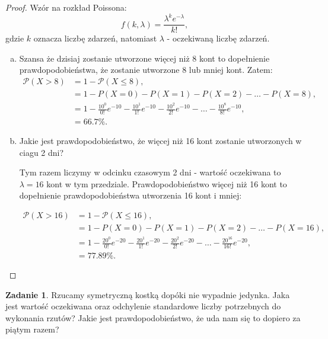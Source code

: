 \documentclass[11pt]{article}
\theoremstyle{definition}
\newtheorem{zadanie}{Zadanie}
\numberwithin{zadanie}{section}
\begin{document}
\begin{proof}Wzór na rozkład Poissona:
    $$f(k,\lambda) = \frac{\lambda^ke^{-\lambda}}{k!},$$
    gdzie $k$ oznacza liczbę zdarzeń, natomiast $\lambda$ - oczekiwaną liczbę zdarzeń.
    \begin{enumerate}[a)]
        \item Szansa że dzisiaj zostanie utworzone więcej niż 8 kont to dopełnienie prawdopodobieństwa, że zostanie utworzone 8 lub mniej kont. Zatem:
              \begin{align*}
                  \mathcal P(X>8) & = 1-\mathcal P(X\leq 8),                                                                                \\
                                  & = 1-P(X=0)-P(X=1)-P(X=2)-\dots-P(X=8),                                                                  \\
                                  & = 1- \frac{10^0}{0!}e^{-10}-\frac{10^1}{1!}e^{-10}-\frac{10^2}{2!}e^{-10}-\dots-\frac{10^8}{8!}e^{-10}, \\
                                  & = 66.7\%.
              \end{align*}
        \item Jakie jest prawdopodobieństwo, że więcej niż 16 kont zostanie utworzonych w ciagu 2 dni?

              Tym razem liczymy w odcinku czasowym 2 dni - wartość oczekiwana to $\lambda=16$ kont w tym przedziale.
              Prawdopodobieństwo więcej niż 16 kont to dopełnienie prawdopodobieństwa utworzenia 16 kont i mniej:

              \begin{align*}
                  \mathcal P(X>16) & = 1-\mathcal P(X\leq 16),                                                                                 \\
                                   & = 1-P(X=0)-P(X=1)-P(X=2)-\dots-P(X=16),                                                                   \\
                                   & = 1- \frac{20^0}{0!}e^{-20}-\frac{20^1}{1!}e^{-20}-\frac{20^2}{2!}e^{-20}-\dots-\frac{20^{16}}{16!}e^{-20}, \\
                                   & = 77.89\%.
              \end{align*}
    \end{enumerate}
\end{proof}
\begin{zadanie}
    Rzucamy symetryczną kostką dopóki nie wypadnie jedynka. Jaka jest wartość oczekiwana oraz odchylenie standardowe liczby potrzebnych do wykonania rzutów?
    Jakie jest prawdopodobieństwo, że uda nam się to dopiero za piątym razem?
\end{zadanie}
\end{document}
